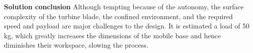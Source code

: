 




\textbf{Solution conclusion}
Although tempting because of the autonomy, the surface complexity of the
turbine blade, the confined environment, and the required speed and payload are
major challenges to the design. It is estimated a load of 50 kg, which greatly
increases the dimensions of the mobile base and hence diminishes their
workspace, slowing the process.

